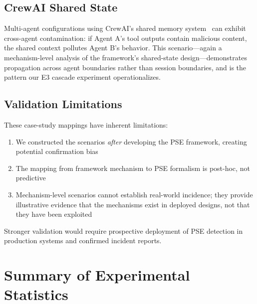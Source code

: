 \documentclass{article}
\theoremstyle{plain}
\theoremstyle{definition}
\begin{document}
\subsection{CrewAI Shared State}

Multi-agent configurations using CrewAI's shared memory system~\cite{crewaimemory2024} can exhibit cross-agent contamination: if Agent A's tool outputs contain malicious content, the shared context pollutes Agent B's behavior. This scenario---again a mechanism-level analysis of the framework's shared-state design---demonstrates propagation across agent boundaries rather than session boundaries, and is the pattern our E3 cascade experiment operationalizes.

\subsection{Validation Limitations}

These case-study mappings have inherent limitations:
\begin{enumerate}
    \item We constructed the scenarios \emph{after} developing the PSE framework, creating potential confirmation bias
    \item The mapping from framework mechanism to PSE formalism is post-hoc, not predictive
    \item Mechanism-level scenarios cannot establish real-world incidence; they provide illustrative evidence that the mechanisms exist in deployed designs, not that they have been exploited
\end{enumerate}

Stronger validation would require prospective deployment of PSE detection in production systems and confirmed incident reports.

\section{Summary of Experimental Statistics}
\label{sec:summarystats}
\end{document}
